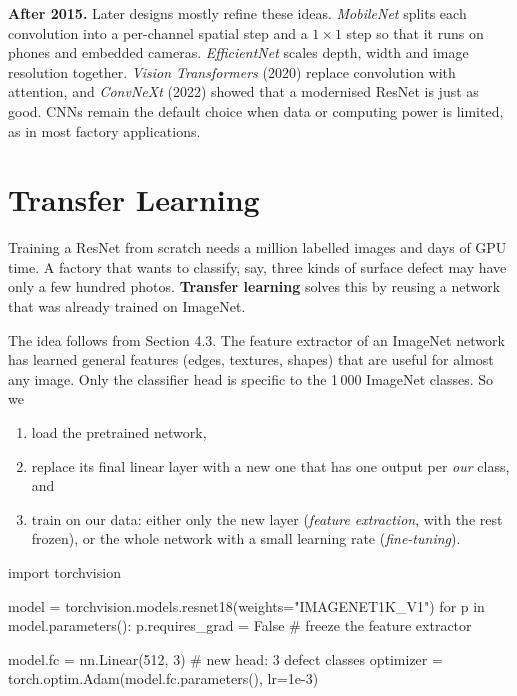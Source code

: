 \documentclass[12pt, a4paper]{article}
\begin{document}
\begin{notebox}
  \textbf{After 2015.} Later designs mostly refine these ideas.
  \emph{MobileNet} splits each convolution into a per-channel spatial step and
  a $1\times1$ step so that it runs on phones and embedded cameras.
  \emph{EfficientNet} scales depth, width and image resolution together.
  \emph{Vision Transformers} (2020) replace convolution with attention, and
  \emph{ConvNeXt} (2022) showed that a modernised ResNet is just as good.
  CNNs remain the default choice when data or computing power is limited,
  as in most factory applications.
\end{notebox}

\section{Transfer Learning}

Training a ResNet from scratch needs a million labelled images and days of
GPU time. A factory that wants to classify, say, three kinds of surface defect
may have only a few hundred photos. \textbf{Transfer learning} solves this by
reusing a network that was already trained on ImageNet.

The idea follows from Section 4.3. The feature extractor of an ImageNet
network has learned general features (edges, textures, shapes) that are
useful for almost any image. Only the classifier head is specific to the 1\,000
ImageNet classes. So we
\begin{enumerate}[nosep]
  \item load the pretrained network,
  \item replace its final linear layer with a new one that has one output per
        \emph{our} class, and
  \item train on our data: either only the new layer (\emph{feature
          extraction}, with the rest frozen), or the whole network with a small
        learning rate (\emph{fine-tuning}).
\end{enumerate}

\begin{codebox}
import torchvision

model = torchvision.models.resnet18(weights="IMAGENET1K_V1")
for p in model.parameters():
    p.requires_grad = False              # freeze the feature extractor

model.fc = nn.Linear(512, 3)             # new head: 3 defect classes
optimizer = torch.optim.Adam(model.fc.parameters(), lr=1e-3)
\end{codebox}
\end{document}
